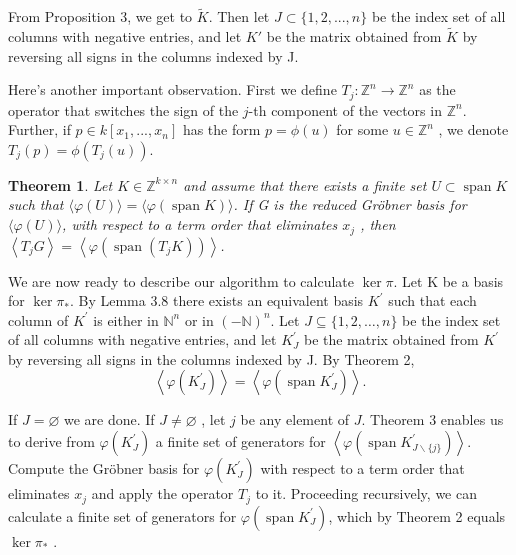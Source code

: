 \documentclass{article}
\theoremstyle{plain}
\newtheorem{theorem}{Theorem}[section]
\theoremstyle{definition}
\begin{document}
From Proposition 3, we get to $\tilde{K}$. Then let $J \subset \{1, 2, ..., n\}$ be the index set of all columns with negative entries, and let $K'$ be the matrix obtained from $\tilde{K}$ by reversing all signs in the columns indexed by J. 

Here's another important observation. First we define $T_j:\mathbb{Z}^n \to \mathbb{Z}^n $ as the operator that switches the sign of the $j$-th component of the vectors in $\mathbb{Z}^n$. Further, if $p \in k[x_1,...,x_n]$ has the form $p = \phi(u)$ for some $u\in\mathbb{Z}^n$ , we denote $T_j (p) = \phi(T_j(u))$. 

\begin{theorem}Let  $K \in \mathbb{Z}^{k \times n}$  and assume that there exists a finite set  $U \subset \operatorname{span} K$  such that  $\langle\varphi(U)\rangle=\langle\varphi(\operatorname{span} K)\rangle$. If G  is the reduced Gröbner basis for  $\langle\varphi(U)\rangle$, with respect to a term order that eliminates  $x_{j}$ , then $ \left\langle T_{j} G\right\rangle=\left\langle\varphi\left(\operatorname{span}\left(T_{j} K\right)\right)\right\rangle$. \end{theorem}

We are now ready to describe our algorithm to calculate  $\operatorname{ker} \pi$. Let K be a basis for $\operatorname{ker}  \pi_{*}$. By Lemma  3.8  there exists an equivalent basis  $K^{\prime}$  such that each column of  $K^{\prime}$  is either in  $\mathbb{N}^{n}$  or in  $(-\mathbb{N})^{n}$. Let  $J \subseteq\{1,2, \ldots, n\}$  be the index set of all columns with negative entries, and let  $K_{J}^{\prime}$  be the matrix obtained from  $K^{\prime}$  by reversing all signs in the columns indexed by J. By Theorem 2, 
$$\left\langle\varphi\left(K_{J}^{\prime}\right)\right\rangle=\left\langle\varphi\left(\operatorname{span} K_{J}^{\prime}\right)\right\rangle .$$

If  $J=\varnothing$  we are done. If  $J \neq \varnothing$ , let  $j$  be any element of  $J$. Theorem 3 enables us to derive from  $\varphi\left(K_{J}^{\prime}\right)$  a finite set of generators for  $\left\langle\varphi\left(\operatorname{span} K_{J \backslash\{j\}}^{\prime}\right)\right\rangle$. Compute the Gröbner basis for  $\varphi\left(K_{J}^{\prime}\right)$  with respect to a term order that eliminates  $x_{j}$  and apply the operator  $T_{j}$  to it. Proceeding recursively, we can calculate a finite set of generators for  $\varphi\left(\operatorname{span} K_{J}^{\prime}\right)$, which by Theorem 2 equals $\operatorname{ker} \pi_*$ .
\end{document}
